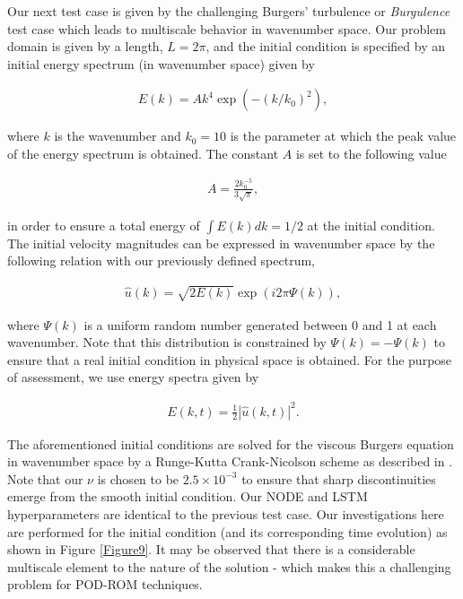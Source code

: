 \documentclass[preprint,12pt]{elsarticle}
\begin{document}
Our next test case is given by the challenging Burgers' turbulence or \emph{Burgulence} test case which leads to multiscale behavior in wavenumber space. Our problem domain is given by a length, $L=2 \pi$, and the initial condition is specified by an initial energy spectrum (in wavenumber space) given by
\begin{linenomath*}
\begin{align}
E(k)=A k^{4} \exp \left(-\left(k / k_{0}\right)^{2}\right),
\end{align}
\end{linenomath*}
where $k$ is the wavenumber and $k_0 = 10$ is the parameter at which the peak value of the energy spectrum is obtained. The constant $A$ is set to the following value
\begin{linenomath*}
\begin{align}
A=\frac{2 k_{0}^{-5}}{3 \sqrt{\pi}},
\end{align}
\end{linenomath*}
in order to ensure a total energy of $\int E(k) d k=1 / 2$ at the initial condition. The initial velocity magnitudes can be expressed in wavenumber space by the following relation with our previously defined spectrum,
\begin{linenomath*}
\begin{align}
\hat{u}(k)=\sqrt{2 E(k)} \exp (i 2 \pi \Psi(k)),
\end{align}
\end{linenomath*}
where $\Psi(k)$ is a uniform random number generated between 0 and 1 at each wavenumber. Note that this distribution is constrained by $\Psi(k) = -\Psi(k)$ to ensure that a real initial condition in physical space is obtained. For the purpose of assessment, we use energy spectra given by
\begin{linenomath*}
\begin{align}
E(k, t)=\frac{1}{2}|\hat{u}(k, t)|^{2}.
\end{align}
\end{linenomath*}
The aforementioned initial conditions are solved for the viscous Burgers equation in wavenumber space by a Runge-Kutta Crank-Nicolson scheme as described in \cite{san2013stationary}. Note that our $\nu$ is chosen to be $2.5\times10^{-3}$ to ensure that sharp discontinuities emerge from the smooth initial condition. Our NODE and LSTM hyperparameters are identical to the previous test case. Our investigations here are performed for the initial condition (and its corresponding time evolution) as shown in Figure \ref{Figure9}. It may be observed that there is a considerable multiscale element to the nature of the solution - which makes this a challenging problem for POD-ROM techniques. 
\end{document}
